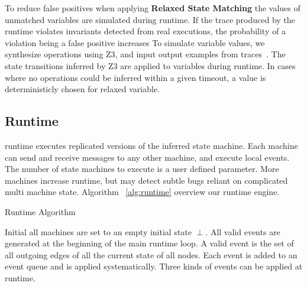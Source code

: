 To reduce false positives when applying \textbf{Relaxed State Matching} the
values of unmatched variables are simulated during runtime. If the trace
produced by the runtime violates invariants detected from real executions, the
probability of a violation being a false positive increases  To simulate variable values, we synthesize operations
using Z3, and input output examples from traces~\cite{SMTSynth}. The state
transitions inferred by Z3 are applied to variables during runtime. In cases
where no operations could be inferred within a given timeout, a value is
deterministicly chosen for relaxed variable.

\subsection{Runtime}

 runtime executes replicated versions of the inferred state machine.
Each machine can send and receive messages to any other machine, and execute
local events. The number of state machines to execute is a user defined
parameter. More machines increase runtime, but may detect subtle bugs reliant
on complicated multi machine state. Algorithm ~\ref{alg:runtime} overview our
runtime engine.

\begin{algorithm}
    \caption{Runtime Algorithm}
    \label{alg:runtime}
\end{algorithm}

Initial all machines are set to an empty initial state $\perp$. All valid events are
generated at the beginning of the main runtime loop. A valid event is the set
of all outgoing edges of all the current state of all nodes. Each event is
added to an event queue and is applied systematically. Three kinds of events can
be applied at runtime.

